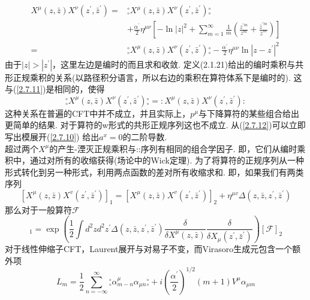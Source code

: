 \begin{equation}\label{2.7.11}
\begin{aligned}
X^{\mu}(z, \bar{z}) X^{\nu}\left(z^{\prime}, \bar{z}^{\prime}\right)=&{ }_{\circ}^{\circ} X^{\mu}(z, \bar{z}) X^{\nu}\left(z^{\prime}, \bar{z}^{\prime}\right)  { }_{\circ}^{\circ} \\
&+\frac{\alpha^{\prime}}{2} \eta^{\mu \nu}\left[-\ln |z|^{2}+\sum_{m=1}^{\infty} \frac{1}{m}\left(\frac{z^{\prime m}}{z^{m}}+\frac{\bar{z}^{\prime m}}{\bar{z}^{m}}\right)\right]\\
=&{ }_{\circ}^{\circ} X^{\mu}(z, \bar{z}) X^{\nu}\left(z^{\prime}, \bar{z}^{\prime}\right)  { }_{\circ}^{\circ}-\frac{\alpha^{\prime}}{2} \eta^{\mu \nu}\ln |z-z^\prime|^{2}
\end{aligned}
\end{equation}
由于$|z|>\left|z^{\prime}\right|$，这里左边是编时的而且求和收敛. 定义(2.1.21)给出的编时乘积与共形正规乘积的关系(以路径积分语言，所以右边的乘积在算符体系下是编时的). 这与(\ref{2.7.11})是相同的，使得
\begin{equation}\label{2.7.12}
{ }_\circ^{\circ} X^{\mu}(z, \bar{z}) X^{\nu}\left(z^{\prime}, \bar{z}^{\prime}\right){}_\circ^{\circ}=: X^{\mu}(z, \bar{z}) X^{\nu}\left(z^{\prime}, \bar{z}^{\prime}\right):
\end{equation}
这种关系在普遍的CFT中并不成立，并且实际上，$p^\mu$与下降算符的某些组合给出更简单的结果. 对于算符的w形式的共形正规序列这也不成立.
从(\ref{2.7.12})可以立即写出模展开(\ref{2.7.10}) 给出$a^x=0$的二阶导数.\\
超过两个$X^\mu$的产生-湮灭正规乘积与::序列有相同的组合学因子. 即，它们从编时乘积中，通过对所有的收缩获得(场论中的Wick定理). 为了将算符的正规序列从一种形式转化到另一种形式，利用两点函数的差对所有收缩求和. 即，如果我们有两类序列
\begin{equation}
\left[X^{\mu}(z, \bar{z}) X^{v}\left(z^{\prime}, \bar{z}^{\prime}\right)\right]_{1}=\left[X^{\mu}(z, \bar{z}) X^{v}\left(z^{\prime}, \bar{z}^{\prime}\right)\right]_{2}+\eta^{\mu v} \Delta\left(z, \bar{z}, z^{\prime}, \bar{z}^{\prime}\right)
\end{equation}
那么对于一般算符$\mathscr{F}$
\begin{equation}
[\mathscr{F}]_{1}=\exp \left(\frac{1}{2} \int d^{2} z d^{2} z^{\prime} \Delta\left(z, \bar{z}, z^{\prime}, \bar{z}^{\prime}\right) \frac{\delta}{\delta X^{\mu}(z, \bar{z})} \frac{\delta}{\delta X_{\mu}\left(z^{\prime}, \bar{z}^{\prime}\right)}\right)[\mathscr{F}]_{2}
\end{equation}
对于线性伸缩子CFT，Laurent展开与对易子不变，而Virasoro生成元包含一个额外项
\begin{equation}
L_{m}=\frac{1}{2} \sum_{n=-\infty}^{\infty}{}_{\circ}^{\circ} \alpha_{m-n}^{\mu} \alpha_{\mu n}{}_{\circ}^{\circ}+i\left(\frac{\alpha^{\prime}}{2}\right)^{1 / 2}(m+1) V^{\mu} \alpha_{\mu m}
\end{equation}

